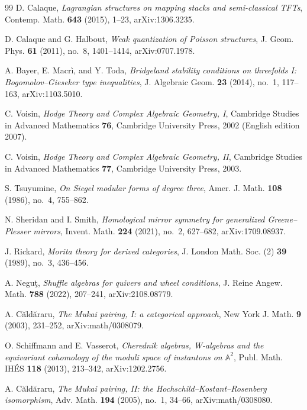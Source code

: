 \begin{thebibliography}{99}
D. Calaque, \emph{Lagrangian structures on mapping stacks and semi-classical TFTs}, Contemp. Math. \textbf{643} (2015), 1--23, arXiv:1306.3235.

D. Calaque and G. Halbout, \emph{Weak quantization of Poisson structures}, J. Geom. Phys. \textbf{61} (2011), no.~8, 1401--1414, arXiv:0707.1978.

A. Bayer, E. Macr\`i, and Y. Toda, \emph{Bridgeland stability conditions on threefolds I: Bogomolov--Gieseker type inequalities}, J. Algebraic Geom. \textbf{23} (2014), no.~1, 117--163, arXiv:1103.5010.

C. Voisin, \emph{Hodge Theory and Complex Algebraic Geometry, I}, Cambridge Studies in Advanced Mathematics \textbf{76}, Cambridge University Press, 2002 (English edition 2007).

C. Voisin, \emph{Hodge Theory and Complex Algebraic Geometry, II}, Cambridge Studies in Advanced Mathematics \textbf{77}, Cambridge University Press, 2003.

S. Tsuyumine, \emph{On Siegel modular forms of degree three}, Amer. J. Math. \textbf{108} (1986), no.~4, 755--862.

N. Sheridan and I. Smith, \emph{Homological mirror symmetry for generalized Greene--Plesser mirrors}, Invent. Math. \textbf{224} (2021), no.~2, 627--682, arXiv:1709.08937.

J. Rickard, \emph{Morita theory for derived categories}, J. London Math. Soc. (2) \textbf{39} (1989), no.~3, 436--456.

A. Negu\c{t}, \emph{Shuffle algebras for quivers and wheel conditions}, J. Reine Angew. Math. \textbf{788} (2022), 207--241, arXiv:2108.08779.

A. C{\u a}ld{\u a}raru, \emph{The Mukai pairing, I: a categorical approach}, New York J. Math. \textbf{9} (2003), 231--252, arXiv:math/0308079.

O. Schiffmann and E. Vasserot, \emph{Cherednik algebras, W-algebras and the equivariant cohomology of the moduli space of instantons on $\mathbb{A}^2$}, Publ. Math. IH\'ES \textbf{118} (2013), 213--342, arXiv:1202.2756. %

A. C{\u a}ld{\u a}raru, \emph{The Mukai pairing, II: the Hochschild--Kostant--Rosenberg isomorphism}, Adv. Math. \textbf{194} (2005), no.~1, 34--66, arXiv:math/0308080. %


\end{thebibliography}
